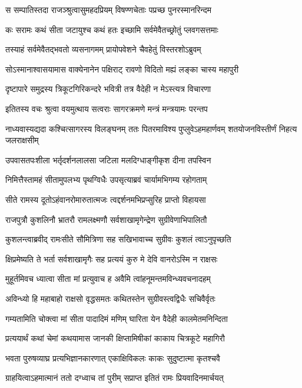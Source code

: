 \twolineshloka
{स सम्पातिस्तदा राजञ्श्रुत्वासुमहदप्रियम्}
{विषण्णचेताः पप्रच्छ पुनरस्मानरिन्दम}


\twolineshloka
{कः सरामः कथं सीता जटायुश्च कथं हतः}
{इच्छामि सर्वमेवैतच्छ्रोतुं प्लवगसत्तमाः}


\twolineshloka
{तस्याहं सर्वमेवैतद्भवतो व्यसनागमम्}
{प्रायोपवेशने चैवहेतुं विस्तरशोऽब्रुवम्}


\twolineshloka
{सोऽस्मानाश्वासयामास वाक्येनानेन पक्षिराट्}
{रावणो विदितो मह्यं लङ्का चास्य महापुरी}


\twolineshloka
{दृष्टापारे समुद्रस्य त्रिकूटगिरिकन्दरे}
{भवित्री तत्र वैदेही न मेऽस्त्यत्र विचारणा}


\twolineshloka
{इतितस्य वचः श्रुत्वा वयमुत्थाय सत्वराः}
{सागरक्रमणे मन्त्रं मन्त्रयामः परन्तप}


\threelineshloka
{नाध्यवास्यद्यदा कश्चित्सागरस्य विलङ्घनम्}
{ततः पितरमाविश्य पुप्लुवेऽहमहार्णवम्}
{शतयोजनविस्तीर्णं निहत्य जलराक्षसीम्}


\twolineshloka
{उपवासतपःशीला भर्तृदर्शनलालसा}
{जटिला मलदिग्धाङ्गीकृश दीना तपस्विन}


\twolineshloka
{निमित्तैस्तामहं सीतामुपलभ्य पृथग्विधैः}
{उपसृत्याब्रवं चार्यामभिगम्य रहोगताम्}


\twolineshloka
{सीते रामस्य दूतोऽहंवानरोमारुतात्मजः}
{त्वद्दर्शनमभिप्रप्सुरिह प्राप्तो विहायसा}


\twolineshloka
{राजपुत्रौ कुशलिनौ भ्रातरौ रामलक्ष्मणौ}
{सर्वशाखामृगेन्द्रेण सुग्रीवेणाभिपालितौ}


\twolineshloka
{कुशलन्त्वाब्रवीद् रामःसीते सौमित्रिणा सह}
{सखिभावाच्च सुग्रीवः कुशलं त्वाऽनुपृच्छति}


\twolineshloka
{क्षिप्रमेष्यति ते भर्ता सर्वशाखामृगैः सह}
{प्रत्ययं कुरु मे देवि वानरोऽस्मि न राक्षसः}


\twolineshloka
{मुहूर्तमिवच ध्यात्वा सीता मां प्रत्युवाच ह}
{अवैमि त्वांहनूमन्तमविन्ध्यवचनादहम्}


\twolineshloka
{अविन्ध्यो हि महाबाहो राक्षसो वृद्धसमतः}
{कथितस्तेन सुग्रीवस्त्वद्विधैः सचिवैर्वृतः}


\twolineshloka
{गम्यतामिति चोक्त्वा मां सीता पादादिमं मणिम्}
{घारिता येन वैदेही कालमेतमनिन्दिता}


\twolineshloka
{प्रत्ययार्थं कथां चेमां कथयामास जानकी}
{क्षिप्तामिषीकां काकाय चित्रकूटे महागिरौ}


\twolineshloka
{भवता पुरुषव्याघ्र प्रत्यभिज्ञानकारणात्}
{एकाक्षिविकलः काकः सुदुष्टात्मा कृतश्चवै}


\twolineshloka
{ग्राहयित्वाऽहमात्मानं ततो दग्ध्वाच तां पुरीम्}
{सप्राप्त इतितं रामः प्रियवादिनमार्चयत्}


